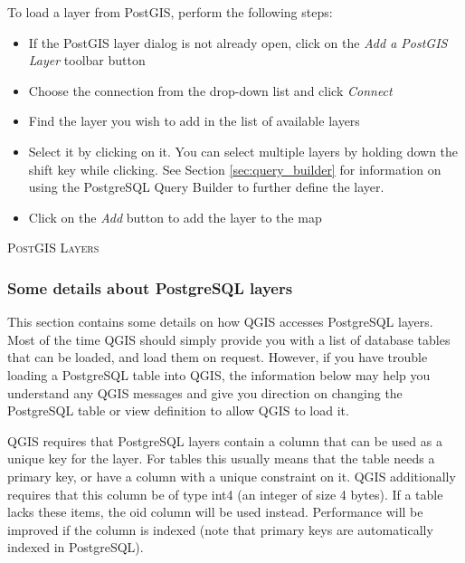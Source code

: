 To load a layer from PostGIS, perform the following steps:

\begin{itemize}
\item If the PostGIS layer dialog is not already open, click on the
\textit{Add a PostGIS Layer} toolbar button
\item Choose the connection from the drop-down list and click \textsl{Connect}
\item Find the layer you wish to add in the list of available layers
\item Select it by clicking on it. You can select multiple layers by holding
down the shift key while clicking. See Section \ref{sec:query_builder} for
information on using the PostgreSQL Query Builder to further define the layer.
\item Click on the \textsl{Add} button to add the layer to the map
\end{itemize}

\begin{Tip}\caption{\textsc{PostGIS Layers}}
\end{Tip}

\subsubsection{Some details about PostgreSQL
layers}\label{sec:postgis_details}

This section contains some details on how QGIS accesses PostgreSQL
layers. Most of the time QGIS should simply provide you with a list of
database tables that can be loaded, and load them on request. However,
if you have trouble loading a PostgreSQL table into QGIS, the information
below may help you understand any QGIS messages and give you direction on
changing the PostgreSQL table or view definition to allow QGIS to load it.

QGIS requires that PostgreSQL layers contain a column that can be
used as a unique key for the layer. For tables this usually means
that the table needs a primary key, or have a column with a unique
constraint on it. QGIS additionally requires that this column be of
type int4 (an integer of size 4 bytes). If a table lacks these items,
the oid column will be used instead. Performance will be improved if the
column is indexed (note that primary keys are automatically indexed in
PostgreSQL). 

